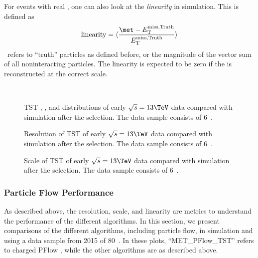 For events with real \met, one can also look at the \textit{linearity} in simulation.
This is defined as
\begin{equation}
\text{linearity} = \langle \frac{\met - \mettrue}{\mettrue}  \rangle
\end{equation}
\mettrue~refers to ``truth'' particles as defined before, or the magnitude of the vector sum of all noninteracting particles.
The linearity is expected to be zero if the \met is reconstructed at the correct scale.

\begin{figure}
\caption{TST , , and \met distributions of early $\sqrt{s} = 13 \TeV$ data compared with simulation after the \Zmm selection. The data sample consists of 6~\ipb.} \label{fig:tst_met_zmumu}
 \\
\end{figure}

\begin{figure}
\caption{Resolution of TST \met of early $\sqrt{s} = 13 \TeV$ data compared with simulation after the \Zmm selection. The data sample consists of 6~\ipb.} \label{fig:tst_met_resolution_zmumu}
\end{figure}

\begin{figure}
\caption{Scale of TST \met of early $\sqrt{s} = 13 \TeV$ data compared with simulation after the \Zmm selection. The data sample consists of 6~\ipb.} \label{fig:tst_met_scale_zmumu}
\end{figure}


\subsubsection{Particle Flow Performance}

As described above, the resolution, scale, and linearity are metrics to understand the performance of the different \met algorithms.
In this section, we present comparisons of the different algorithms, including particle flow, in simulation and using a data sample from 2015 of 80~\ipb.
In these plots, ``MET\_PFlow\_TST'' refers to charged PFlow \met, while the other algorithms are as described above.

